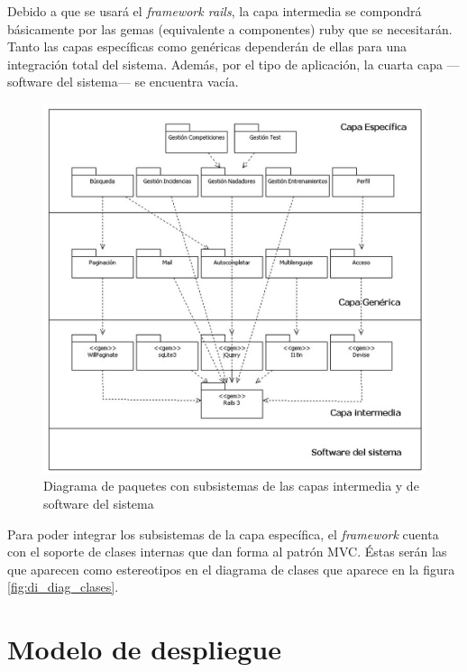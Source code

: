 		Debido a que se usará el {\it framework rails}, la capa intermedia se compondrá básicamente por las gemas (equivalente a componentes) ruby que se necesitarán. Tanto las capas específicas como genéricas dependerán de ellas para una integración total del sistema. Además, por el tipo de aplicación, la cuarta capa ---software del sistema--- se encuentra vacía.
		
		\begin{figure}[H]
		  \centering
		    \includegraphics[width=16cm]{./eps/di_diagpaquetes/di_diagpaquetes.eps}
		  \caption{Diagrama de paquetes con subsistemas de las capas intermedia y de software del sistema}
		  \label{fig:di_sec_vernadador}
		\end{figure}
		
		Para poder integrar los subsistemas de la capa específica, el {\it framework} cuenta con el soporte de clases internas que dan forma al patrón MVC. Éstas serán las que aparecen como estereotipos en el diagrama de clases que aparece en la figura \ref{fig:di_diag_clases}. 
	

	\section{Modelo de despliegue} %
		\label{sec:modelo_de_despliegue}
	
